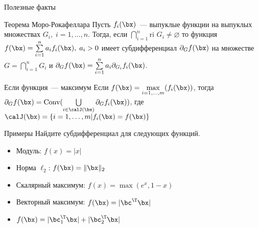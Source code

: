 \documentclass[12pt]{beamer}
\begin{document}
\begin{frame}{Полезные факты}
\begin{block}{Теорема Моро-Рокафеллара}
Пусть $f_i(\bx)$~--- выпуклые функции на выпуклых множествах $G_i, \; i = 1,\ldots,n$. 
Тогда, если $\bigcap\limits_{i=1}^n \text{ri } G_i \neq \varnothing$ то функция $f(\bx) = \sum\limits_{i=1}^n a_i f_i(\bx), \; a_i > 0$ имеет субдифференциал $\partial_G f(\bx)$ на множестве $G = \bigcap\limits_{i=1}^n G_i$ и $\partial_G f(\bx) = \sum\limits_{i=1}^n a_i \partial_{G_i} f_i(\bx)$. 
\end{block}

\begin{block}{Если функция~--- максимум}
Если $f(\bx) = \max\limits_{i=1,\ldots,m}(f_i(\bx))$, тогда 
\pause
$\partial_G f(\bx) = \text{Conv} (\bigcup\limits_{i \in \calJ(\bx)} \partial_G f_i(\bx))$, где $\calJ(\bx) = \{ i = 1,\ldots, m | f_i(\bx) = f(\bx) \}$
\end{block}
\end{frame}

\begin{frame}{Примеры}
Найдите субдифференциал для следующих функций.
\begin{itemize}
\item Модуль: $f(x) = |x|$
\item Норма $\ell_2$: $f(\bx) = \| \bx \|_2$
\item Скалярный максимум: $f(x) = \max(e^x, 1 - x)$
\item Векторный максимум: $f(\bx) = |\bc^{\T}\bx|$
\item $f(\bx) = |\bc^{\T}_1\bx| + |\bc^{\T}_2\bx|$
\end{itemize}
\end{frame}
\end{document}
